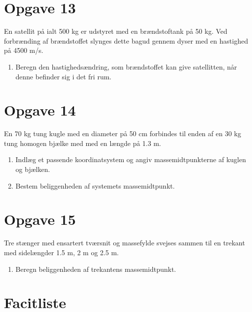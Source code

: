 \documentclass[a4paper, 12pt]{article}
\begin{document}
\section*{Opgave 13}
\label{sec:orgd9f4112}
En satellit på ialt 500 kg er udstyret med en brændstoftank på 50 kg. Ved forbrænding af brændstoffet slynges dette bagud gennem dyser med en hastighed på 4500 m/s.
\begin{enumerate}
\item Beregn den hastighedsændring, som brændstoffet kan give satellitten, når denne befinder sig i det fri rum.
\end{enumerate}
\section*{Opgave 14}
\label{sec:orge8261bb}
En 70 kg tung kugle med en diameter på 50 cm forbindes til enden af en 30 kg tung homogen bjælke med med en længde på 1.3 m.

\begin{enumerate}
\item Indlæg et passende koordinatsystem og angiv massemidtpunkterne af kuglen og bjælken.
\item Bestem beliggenheden af systemets massemidtpunkt.
\end{enumerate}
\section*{Opgave 15}
\label{sec:org55c26d6}
Tre stænger med ensartert tværsnit og massefylde svejses sammen til en trekant med sidelængder 1.5 m, 2 m og 2.5 m.
\begin{enumerate}
\item Beregn beliggenheden af trekantens massemidtpunkt.
\end{enumerate}
\section*{Facitliste}
\label{sec:org2a1dc22}
\end{document}

